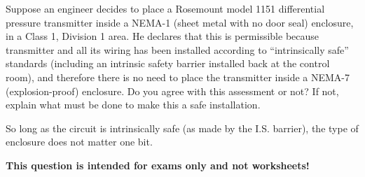 

Suppose an engineer decides to place a Rosemount model 1151 differential pressure transmitter inside a NEMA-1 (sheet metal with no door seal) enclosure, in a Class 1, Division 1 area.  He declares that this is permissible because transmitter and all its wiring has been installed according to ``intrinsically safe'' standards (including an intrinsic safety barrier installed back at the control room), and therefore there is no need to place the transmitter inside a NEMA-7 (explosion-proof) enclosure.  Do you agree with this assessment or not?  If not, explain what must be done to make this a safe installation.







So long as the circuit is intrinsically safe (as made by the I.S. barrier), the type of enclosure does not matter one bit.







{\bf This question is intended for exams only and not worksheets!}



